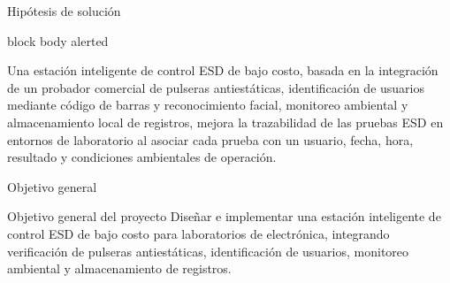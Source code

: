 \documentclass[aspectratio=169]{beamer}
\newcommand{\highlightbox}[1]{
    \begin{beamercolorbox}[
        rounded=true,
        shadow=true,
        wd=\textwidth,
        sep=0.35cm
    ]{block body alerted}
        \justifying
        #1
    \end{beamercolorbox}
}
\begin{document}
\begin{frame}{Hipótesis de solución}

    \vspace{0.35cm}

    \highlightbox{
        \centering
        \large
        Una estación inteligente de control ESD de bajo costo, basada en la integración de un 
        probador comercial de pulseras antiestáticas, identificación de usuarios mediante código 
        de barras y reconocimiento facial, monitoreo ambiental y almacenamiento local de registros, 
        mejora la trazabilidad de las pruebas ESD en entornos de laboratorio al asociar cada 
        prueba con un usuario, fecha, hora, resultado y condiciones ambientales de operación.
    }

\end{frame}

\begin{frame}{Objetivo general}

    \vspace{0.6cm}

    \begin{block}{Objetivo general del proyecto}
        \large
        \justifying
        Diseñar e implementar una estación inteligente de control ESD de bajo costo para 
        laboratorios de electrónica, integrando verificación de pulseras antiestáticas, 
        identificación de usuarios, monitoreo ambiental y almacenamiento de registros.
    \end{block}

\end{frame}
\end{document}
